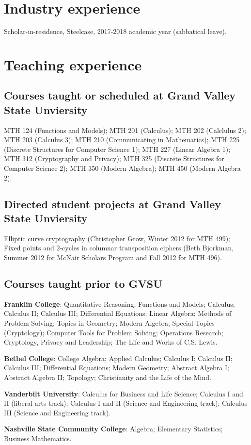 \documentclass[letterpaper]{article}
\renewenvironment{itemize}{
  \begin{list}{}{
    \setlength{\leftmargin}{1.5em}
	\setlength{\itemsep}{0in}
  }
}{
  \end{list}
}
\begin{document}
\section*{Industry experience}
\begin{itemize}
	\item Scholar-in-residence, Steelcase, 2017-2018 academic year (sabbatical leave). 
\end{itemize}


\section*{Teaching experience}

\subsection*{Courses taught or scheduled at Grand Valley State Unviersity}
MTH 124 (Functions and Models); MTH 201 (Calculus); MTH 202 (Calclulus 2); MTH 203 (Calculus 3); MTH 210 (Communicating in Mathematics); MTH 225 (Discrete Structures for Computer Science 1); MTH 227 (Linear Algebra 1);  MTH 312 (Cryptography and Privacy); MTH 325 (Discrete Structures for Computer Science 2); MTH 350 (Modern Algebra); MTH 450 (Modern Algebra 2).


\subsection*{Directed student projects at Grand Valley State Unviersity}
Elliptic curve cryptography (Christopher Grow, Winter 2012 for MTH 499); Fixed points and 2-cycles in columnar transposition ciphers (Beth Bjorkman, Summer 2012 for McNair Scholars Program and Fall 2012 for MTH 496).

\subsection*{Courses taught prior to GVSU}

\begin{itemize}
	\item \textbf{Franklin College}: Quantitative Reasoning; Functions and Models; Calculus; Calculus II; Calculus III; Differential Equations; Linear Algebra; Methods of Problem Solving; Topics in Geometry; Modern Algebra; Special Topics (Cryptology); Computer Tools for Problem Solving; Operations Research; Cryptology, Privacy and Leadership; The Life and Works of C.S. Lewis.
	\item \textbf{Bethel College}: College Algebra; Applied Calculus; Calculus I; Calculus II; Calculus III; Differential Equations; Modern Geometry; Abstract Algebra I; Abstract Algebra II; Topology; Christianity and the Life of the Mind.
	\item \textbf{Vanderbilt University}: Calculus for Business and Life Science; Calculus I and II (liberal arts track); Calculus I and II (Science and Engineering track); Calculus III (Science and Engineering track).
	\item \textbf{Nashville State Community College}: Algebra; Elementary Statistics; Business Mathematics.
\end{itemize}
\end{document}
